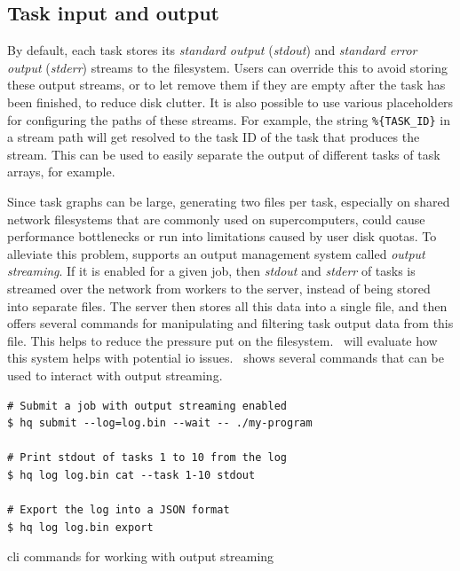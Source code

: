 \subsection{Task input and output}
By default, each \hyperqueue{} task stores its \emph{standard output} (\emph{stdout}) and
\emph{standard error output} (\emph{stderr}) streams to the filesystem. Users can override this to avoid storing these
output streams, or to let \hq{} remove them if they are empty after the task has
been finished, to reduce disk clutter. It is also possible to use various placeholders for
configuring the paths of these streams. For example, the string \texttt{\%\{TASK\_ID\}} in a stream
path will get resolved to the task ID of the task that produces the stream. This can be used to
easily separate the output of different tasks of task arrays, for example.

Since task graphs can be large, generating two files per task, especially on shared network
filesystems that are commonly used on supercomputers, could cause performance bottlenecks or run
into limitations caused by user disk quotas. To alleviate this problem, \hq{}
supports an output management system called \emph{output streaming}. If it is enabled for a given
job, then \emph{stdout} and \emph{stderr} of tasks is streamed over the network
from workers to the server, instead of being stored into separate files. The server then stores all
this data into a single file, and then offers several commands for manipulating and filtering task
output data from this file. This helps to reduce the pressure put on the
filesystem.~ will evaluate how this system helps with potential
\gls{io} issues.~ shows several \hq{}
commands that can be used to interact with output streaming.

\begin{listing}[h]
	\begin{verbatim}
# Submit a job with output streaming enabled
$ hq submit --log=log.bin --wait -- ./my-program

# Print stdout of tasks 1 to 10 from the log
$ hq log log.bin cat --task 1-10 stdout

# Export the log into a JSON format
$ hq log log.bin export
	\end{verbatim}
	\caption{\hyperqueue{} \gls{cli} commands for working with output streaming}
	\label{lst:hq-cli-log}
\end{listing}

